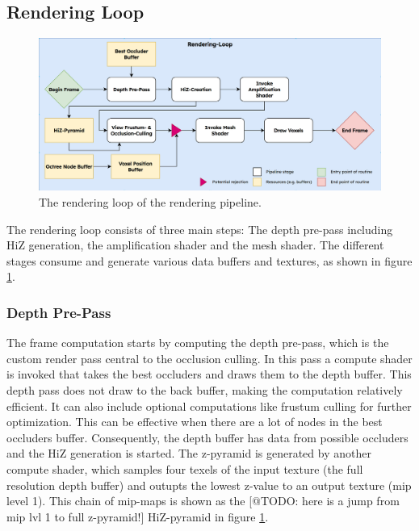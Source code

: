 \subsection*{Rendering Loop} \label{sec-rendering-loop}

\begin{figure}[h]
    \centering
    \includegraphics[width=\linewidth]{images/graphics/rendering-loop.jpg}
    \caption{The rendering loop of the rendering pipeline.}
    \label{fig:pipeline-loop}
\end{figure}

\noindent
The rendering loop consists of three main steps: The depth pre-pass including \ac{HiZ} generation, the 
amplification shader and the mesh shader. The different stages consume and generate various data buffers 
and textures, as shown in figure \ref{fig:pipeline-loop}. 

\subsubsection*{Depth Pre-Pass} \label{subsec-depth-prepass}

The frame computation starts by computing the depth pre-pass, which is the custom render pass central 
to the occlusion culling. In this pass a compute shader is invoked that takes the best occluders and 
draws them to the depth buffer. This depth pass does not draw to the back buffer, making the computation 
relatively efficient. It can also include optional computations like frustum culling for further 
optimization. This can be effective when there are a lot of nodes in the best occluders buffer. 
Consequently, the depth buffer has data from possible occluders and the \ac{HiZ} generation is started. 
The z-pyramid is generated by another compute shader, which samples four texels of the input texture 
(the full resolution depth buffer) and outupts the lowest z-value to an output texture (mip level 1). 
This chain of mip-maps is shown as the [@TODO: here is a jump from mip lvl 1 to full z-pyramid!]
\ac{HiZ}-pyramid in figure \ref{fig:pipeline-loop}.


